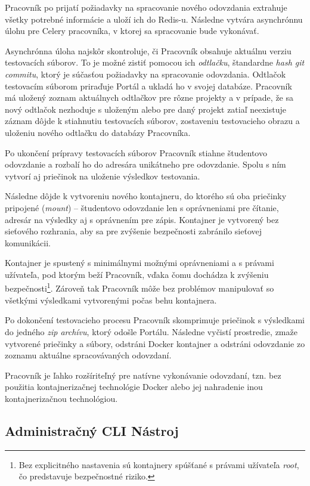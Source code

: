 \documentclass[
  digital, %
  oneside, %
  table,   %
  lof,     %
  lot,   %
]{fithesis3}
\begin{document}
Pracovník po prijatí požiadavky na spracovanie nového odovzdania extrahuje všetky potrebné informácie a uloží ich do Redis-u. Následne vytvára asynchrónnu úlohu pre Celery pracovníka, v ktorej sa spracovanie bude vykonávať.

Asynchrónna úloha najskôr skontroluje, či Pracovník obsahuje aktuálnu verziu testovacích súborov. To je možné zistiť pomocou ich \emph{odtlačku}, štandardne \emph{hash git commitu}, ktorý je súčasťou požiadavky na spracovanie odovzdania. Odtlačok testovacím súborom priraďuje Portál a ukladá ho v svojej databáze. Pracovník má uložený zoznam aktuálnych odtlačkov pre rôzne projekty a v prípade, že sa nový odtlačok nezhoduje s uloženým alebo pre daný projekt zatiaľ neexistuje záznam dôjde k stiahnutiu testovacích súborov, zostaveniu testovacieho obrazu a uloženiu nového odtlačku do databázy Pracovníka. 

Po ukončení prípravy testovacích súborov Pracovník stiahne študentovo odovzdanie a rozbalí ho do adresára unikátneho pre odovzdanie. Spolu s ním vytvorí aj priečinok na uloženie výsledkov testovania. 

Následne dôjde k vytvoreniu nového kontajneru, do ktorého sú oba priečinky pripojené (\emph{mount}) -- študentovo odovzdanie len s oprávneniami pre čítanie, adresár na výsledky aj s oprávnením pre zápis. Kontajner je vytvorený bez sieťového rozhrania, aby sa pre zvýšenie bezpečnosti zabránilo sieťovej komunikácii.

Kontajner je spustený s minimálnymi možnými oprávneniami a s právami užívateľa, pod ktorým beží Pracovník, vďaka čomu dochádza k zvýšeniu bezpečnosti\footnote{Bez explicitného nastavenia sú kontajnery spúšťané s právami užívateľa \emph{root}, čo predstavuje bezpečnostné riziko.}. Zároveň tak Pracovník môže bez problémov manipulovať so všetkými výsledkami vytvorenými počas behu kontajnera.

Po dokončení testovacieho procesu Pracovník skomprimuje priečinok s výsledkami do jedného \emph{zip archívu}, ktorý odošle Portálu. Následne vyčistí prostredie, zmaže vytvorené priečinky a súbory, odstráni Docker kontajner a odstráni odovzdanie zo zoznamu aktuálne spracovávaných odovzdaní.

Pracovník je ľahko rozšíriteľný pre natívne vykonávanie odovzdaní, tzn. bez použitia kontajnerizačnej technológie Docker alebo jej nahradenie inou kontajnerizačnou technológiou.

\subsection{Administračný CLI Nástroj}
\end{document}
